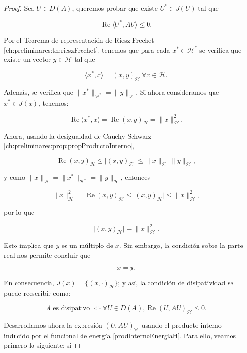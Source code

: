 \begin{proof}
    Sea $U \in D(A)$, queremos probar que existe $U^* \in J(U)$ tal que

    \[\operatorname{Re}\langle U^*, AU\rangle \leq 0.\]

    Por el Teorema de representación de Riesz-Frechet \ref{ch:preliminares:th:rieszFrechet}, tenemos que para cada $x^* \in \mathcal{H}^*$ se verifica que existe un vector $y \in \mathcal{H}$ tal que

    \[\langle x^*, x \rangle = (x, y)_{\mathcal{H}} \ \forall x \in \mathcal{H}.\]

    Además, se verifica que $\lVert x^* \rVert_{\mathcal{H}^*} = \lVert y \rVert_{\mathcal{H}}$. Si ahora consideramos que $x^* \in J(x)$, tenemos:

    \[\operatorname{Re} \langle x^*, x \rangle = \operatorname{Re} (x,y)_{\mathcal{H}} = \lVert x \rVert^2_{\mathcal{H}}.\]

    Ahora, usando la desigualdad de Cauchy-Schwarz \ref{ch:preliminares:prop:propProductoInterno},

    \[\operatorname{Re}(x,y)_{\mathcal{H}} \leq \lvert (x,y)_{\mathcal{H}} \lvert \leq \lVert x \rVert_{\mathcal{H}} \, \lVert y \rVert_{\mathcal{H}},\]

    y como $\lVert x \rVert_{\mathcal{H}} = \lVert x^* \rVert_{\mathcal{H^*}} = \lVert y \rVert_{\mathcal{H}}$, entonces

    \[\lVert x \rVert^2_{\mathcal{H}} = \operatorname{Re}(x,y)_{\mathcal{H}} \leq \lvert (x,y)_{\mathcal{H}} \lvert \leq \lVert x \rVert^2_{\mathcal{H}},\]

    por lo que

    \[\lvert (x,y)_{\mathcal{H}}\lvert = \lVert x \rVert^2_{\mathcal{H}}.\]

    Esto implica que $y$ es un múltiplo de $x$. Sin embargo, la condición sobre la parte real nos permite concluir que

    \[x = y.\]

    En consecuencia, $J(x) = \{(x, \cdot)_{\mathcal{H}}\}$; y así, la condición de disipatividad se puede reescribir como:

    \[A \text{ es disipativo } \iff \forall U \in D(A), \operatorname{Re}(U, AU)_{\mathcal{H}} \leq 0.\]

    Desarrollamos ahora la expresión $(U,AU)_{\mathcal{H}}$ usando el producto interno inducido por el funcional de energía \eqref{prodInternoEnergiaH}. Para ello, veamos primero lo siguiente: si


\end{proof}
